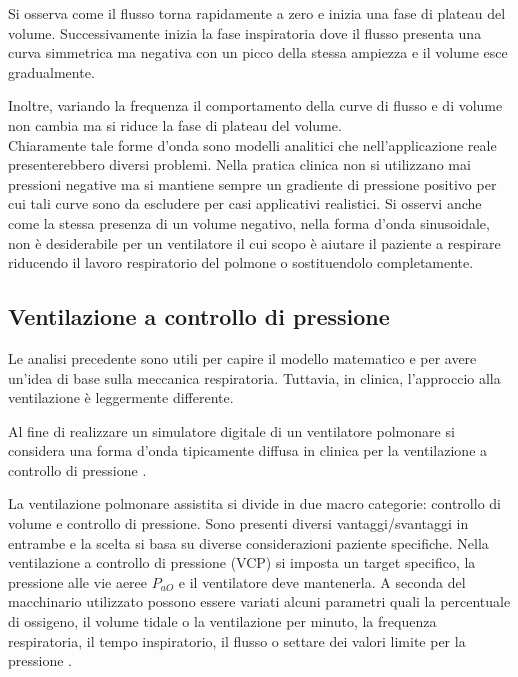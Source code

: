 Si osserva come il flusso torna rapidamente a zero e inizia una fase di plateau del volume. Successivamente inizia la fase inspiratoria dove il flusso presenta una curva simmetrica ma negativa con un picco della stessa ampiezza e il volume esce gradualmente. 

Inoltre, variando la frequenza il comportamento della curve di flusso e di volume non cambia ma si riduce la fase di plateau del volume. 
\\

Chiaramente tale forme d'onda sono modelli analitici che nell'applicazione reale presenterebbero diversi problemi. Nella pratica clinica non si utilizzano mai pressioni negative ma si mantiene sempre un gradiente di pressione positivo per cui tali curve sono da escludere per casi applicativi realistici. Si osservi anche come la stessa presenza di un volume negativo, nella forma d'onda sinusoidale, non è desiderabile per un ventilatore il cui scopo è aiutare il paziente a respirare riducendo il lavoro respiratorio del polmone o sostituendolo completamente.

\subsection{Ventilazione a controllo di pressione}

Le analisi precedente sono utili per capire il modello matematico e per avere un'idea di base sulla meccanica respiratoria. Tuttavia, in clinica, l'approccio alla ventilazione è leggermente differente. 

Al fine di realizzare un simulatore digitale di un ventilatore polmonare si considera una forma d'onda tipicamente diffusa in clinica per la ventilazione a controllo di pressione \cite{al-naggar_modelling_2015}. 

La ventilazione polmonare assistita si divide in due macro categorie: controllo di volume e controllo di pressione. Sono presenti diversi vantaggi/svantaggi in entrambe e la scelta si basa su diverse considerazioni paziente specifiche. Nella ventilazione a controllo di pressione (VCP) si imposta un target specifico, la pressione alle vie aeree $P_{aO}$ e il ventilatore deve mantenerla. A seconda del macchinario utilizzato possono essere variati alcuni parametri quali la percentuale di ossigeno, il volume tidale o la ventilazione per minuto, la frequenza respiratoria, il tempo inspiratorio, il flusso o settare dei valori limite per la pressione \cite{grossbach_overview_2011}.

